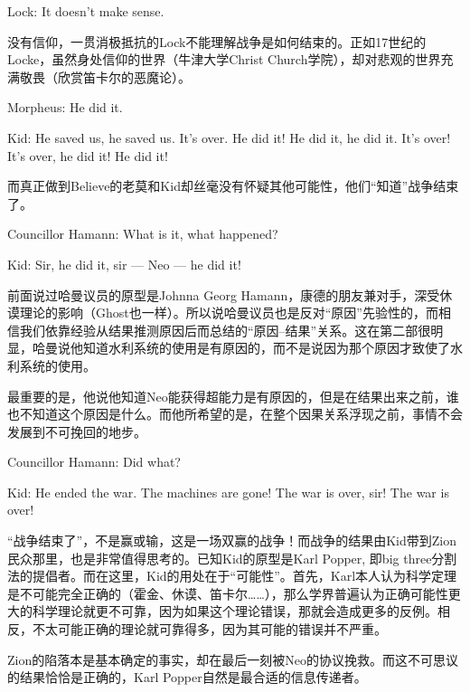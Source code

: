 \documentclass[UTF8]{ctexart}
\newenvironment{myquote}{\color{green} \setlength{\leftskip}{6em} \setlength{\rightskip}{4em} \setlength{\parindent}{-2em}}{\par}
\begin{document}
\begin{myquote}
Lock: It doesn't make sense.
\end{myquote}

没有信仰，一贯消极抵抗的Lock不能理解战争是如何结束的。正如17世纪的Locke，虽然身处信仰的世界（牛津大学Christ Church学院），却对悲观的世界充满敬畏（欣赏笛卡尔的恶魔论）。

\begin{myquote}
Morpheus: He did it.

Kid: He saved us, he saved us. It's over. He did it! He did it, he did it. It's over! It's over, he did it! He did it!
\end{myquote}

而真正做到Believe的老莫和Kid却丝毫没有怀疑其他可能性，他们“知道”战争结束了。

\begin{myquote}
Councillor Hamann: What is it, what happened?

Kid: Sir, he did it, sir --- Neo --- he did it!
\end{myquote}

前面说过哈曼议员的原型是Johnna Georg Hamann，康德的朋友兼对手，深受休谟理论的影响（Ghost也一样）。所以说哈曼议员也是反对“原因”先验性的，而相信我们依靠经验从结果推测原因后而总结的“原因--结果”关系。这在第二部很明显，哈曼说他知道水利系统的使用是有原因的，而不是说因为那个原因才致使了水利系统的使用。

最重要的是，他说他知道Neo能获得超能力是有原因的，但是在结果出来之前，谁也不知道这个原因是什么。而他所希望的是，在整个因果关系浮现之前，事情不会发展到不可挽回的地步。

\begin{myquote}
Councillor Hamann: Did what?

Kid: He ended the war. The machines are gone! The war is over, sir! The war is over!
\end{myquote}

“战争结束了”，不是赢或输，这是一场双赢的战争！而战争的结果由Kid带到Zion民众那里，也是非常值得思考的。已知Kid的原型是Karl Popper, 即big three分割法的提倡者。而在这里，Kid的用处在于“可能性”。首先，Karl本人认为科学定理是不可能完全正确的（霍金、休谟、笛卡尔……），那么学界普遍认为正确可能性更大的科学理论就更不可靠，因为如果这个理论错误，那就会造成更多的反例。相反，不太可能正确的理论就可靠得多，因为其可能的错误并不严重。

Zion的陷落本是基本确定的事实，却在最后一刻被Neo的协议挽救。而这不可思议的结果恰恰是正确的，Karl Popper自然是最合适的信息传递者。
\end{document}
